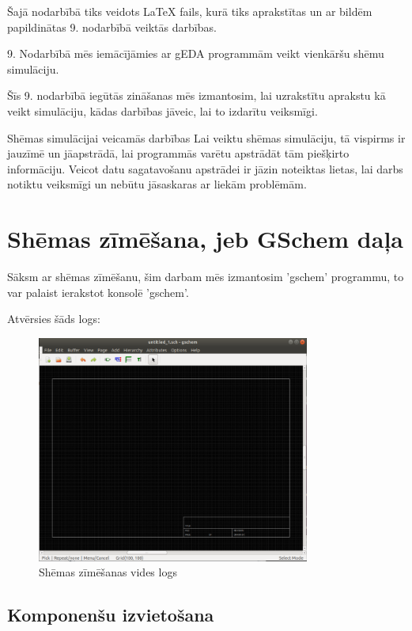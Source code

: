 \documentclass{article}
\begin{document}
Šajā nodarbībā tiks veidots LaTeX fails, kurā tiks aprakstītas un ar bildēm papildinātas 9. nodarbībā veiktās darbības.

9. Nodarbībā mēs iemācījāmies ar gEDA programmām veikt vienkāršu shēmu simulāciju.

Šīs 9. nodarbībā iegūtās zināšanas mēs izmantosim, lai uzrakstītu aprakstu kā veikt simulāciju, kādas darbības jāveic, lai to izdarītu veiksmīgi.

Shēmas simulācijai veicamās darbības
Lai veiktu shēmas simulāciju, tā vispirms ir jauzīmē un jāapstrādā, lai programmās varētu apstrādāt tām piešķirto informāciju. Veicot datu sagatavošanu apstrādei ir jāzin noteiktas lietas, lai darbs notiktu veiksmīgi un nebūtu jāsaskaras ar liekām problēmām.

\section{Shēmas zīmēšana, jeb GSchem daļa}

Sāksm ar shēmas zīmēšanu, šim darbam mēs izmantosim 'gschem' programmu, to var palaist ierakstot konsolē {\large \textsf{'gschem'}}.

\vspace{3mm}
\begin{center}
    Atvērsies šāds logs:
\end{center}

\begin{figure}[H]\centering\includegraphics[width=0.80\textwidth]{pictures/spice/Logs.PNG}\caption{Shēmas zīmēšanas vides logs}\label{picture:10lw1p}\end{figure}

\subsection{Komponenšu izvietošana}
\end{document}
